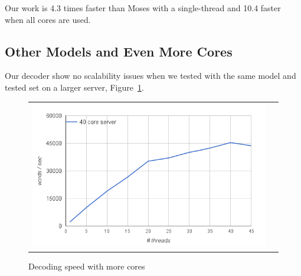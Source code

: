 \documentclass[]{article}
\begin{document}
Our work is 4.3 times faster than Moses with a single-thread and 10.4 faster when all cores are used.

 
\subsection{Other Models and Even More Cores}

Our decoder show no scalability issues when we tested with the same model and tested set on a larger server, Figure~\ref{fig:more-cores}.
\begin{figure}[h]
\centering
\begin{tabular}{cc}
{\includegraphics[scale=0.4]{more-cores.png}} 
\end{tabular}
\caption{Decoding speed with more cores}
\label{fig:more-cores}
\end{figure} 
\end{document}
